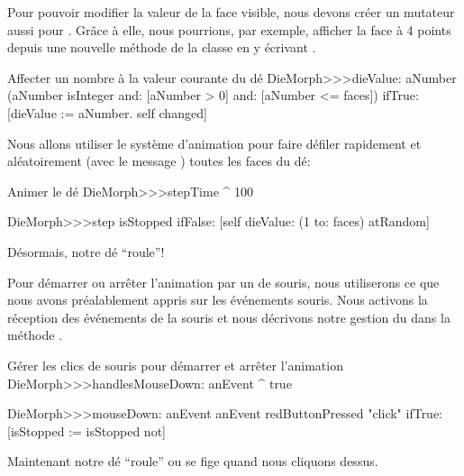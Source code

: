 \documentclass[a4paper,10pt,twoside]{book}
\begin{document}
Pour pouvoir modifier la valeur de la face visible, nous devons
créer un mutateur aussi pour . 
Grâce à elle, nous pourrions, par exemple, afficher la face à 4
points depuis une nouvelle méthode de la classe en y écrivant
.

\begin{method}{Affecter un nombre à la valeur courante du dé}
DieMorph>>>dieValue: aNumber
	(aNumber isInteger
			and: [aNumber > 0]
			and: [aNumber <= faces])
		ifTrue:
			[dieValue := aNumber.
			self changed]
\end{method}

Nous allons utiliser le système d'animation pour faire défiler rapidement 
et aléatoirement (avec le message ) toutes les faces du dé:
\begin{methods}{Animer le dé}
DieMorph>>>stepTime
	^ 100

DieMorph>>>step
	isStopped ifFalse: [self dieValue: (1 to: faces) atRandom]
\end{methods}
Désormais, notre dé ``roule''!

Pour démarrer ou arrêter  l'animation par un \clickbtn de souris, nous
utiliserons ce que nous avons préalablement appris sur les événements souris.
Nous activons la réception des événements de la souris et nous
décrivons notre gestion du \clickbtn dans la
méthode .       

\begin{methods}{Gérer les clics de souris pour démarrer et arrêter l'animation}
DieMorph>>>handlesMouseDown: anEvent
	^ true

DieMorph>>>mouseDown: anEvent
	anEvent redButtonPressed "click"
		ifTrue: [isStopped := isStopped not]
\end{methods}

Maintenant notre dé ``roule'' ou se fige quand nous cliquons dessus.



\end{document}
